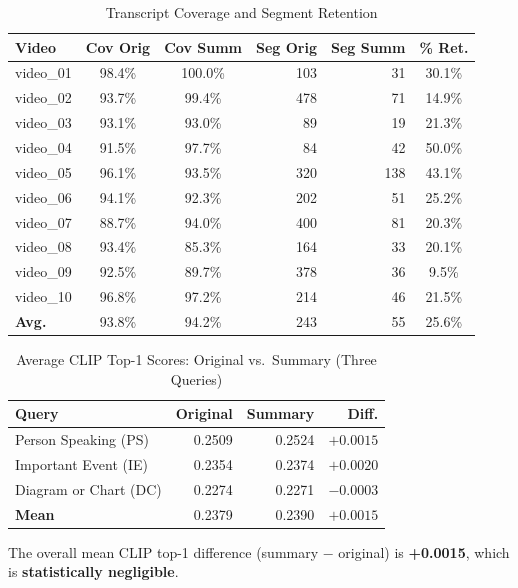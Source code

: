 \documentclass[10pt,conference]{IEEEtran}
\begin{document}
\begin{table}[H]
\centering
\caption{Transcript Coverage and Segment Retention}
\label{tab:vi_seg}
\begin{tabular}{lccrrc}
\toprule
\textbf{Video} & \textbf{Cov Orig} & \textbf{Cov Summ} &
\textbf{Seg Orig} & \textbf{Seg Summ} & \textbf{\% Ret.} \\
\midrule
video\_01 & 98.4\% & 100.0\% & 103 &  31 & 30.1\% \\
video\_02 & 93.7\% &  99.4\% & 478 &  71 & 14.9\% \\
video\_03 & 93.1\% &  93.0\% &  89 &  19 & 21.3\% \\
video\_04 & 91.5\% &  97.7\% &  84 &  42 & 50.0\% \\
video\_05 & 96.1\% &  93.5\% & 320 & 138 & 43.1\% \\
video\_06 & 94.1\% &  92.3\% & 202 &  51 & 25.2\% \\
video\_07 & 88.7\% &  94.0\% & 400 &  81 & 20.3\% \\
video\_08 & 93.4\% &  85.3\% & 164 &  33 & 20.1\% \\
video\_09 & 92.5\% &  89.7\% & 378 &  36 &  9.5\% \\
video\_10 & 96.8\% &  97.2\% & 214 &  46 & 21.5\% \\
\midrule
\textbf{Avg.} & 93.8\% & 94.2\% & 243 & 55 & 25.6\% \\
\bottomrule
\end{tabular}
\end{table}

\begin{table}[H]
\centering
\caption{Average CLIP Top-1 Scores: Original vs.\ Summary (Three Queries)}
\label{tab:clip_scores}
\begin{tabular}{lrrr}
\toprule
\textbf{Query} & \textbf{Original} & \textbf{Summary} & \textbf{Diff.} \\
\midrule
Person Speaking (PS)        & 0.2509 & 0.2524 & $+0.0015$ \\
Important Event (IE)        & 0.2354 & 0.2374 & $+0.0020$ \\
Diagram or Chart (DC)       & 0.2274 & 0.2271 & $-0.0003$ \\
\midrule
\textbf{Mean}               & 0.2379 & 0.2390 & $+0.0015$ \\
\bottomrule
\end{tabular}
\end{table}

The overall mean CLIP top-1 difference (summary $-$ original) is
\textbf{+0.0015}, which is \textbf{statistically negligible}.
\end{document}
